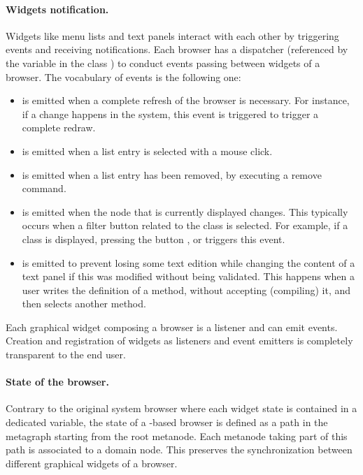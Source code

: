 \documentclass[a4paper,10pt,twoside]{book}
\begin{document}
\paragraph{Widgets notification.} Widgets like menu lists and text panels interact with each other by triggering events and receiving notifications. Each browser has a dispatcher (referenced by the variable  in the class ) to conduct events passing between widgets of a browser. The vocabulary of events is the following one:
\begin{itemize}
\item {} is emitted when a complete refresh of the browser is necessary. For instance, if a change happens in the system, this event is triggered to trigger a complete redraw.

\item {} is emitted when a list entry is selected with a mouse click. 

\item {} is emitted when a list entry has been removed, \eg by executing a remove command. 

\item {} is emitted when the node that is currently displayed changes. This typically occurs when a filter button related to the class is selected. For example, if a class is displayed, pressing the button ,  or  triggers this event.

\item {} is emitted to prevent losing some text edition while changing the content of a text panel if this was modified without being validated. This happens when a user writes the definition of a method, without accepting (\ie compiling) it, and then selects another method.
\end{itemize}

Each graphical widget composing a browser is a listener and can emit events. Creation and registration of widgets as listeners and event emitters is completely transparent to the end user.

\paragraph{State of the browser.} Contrary to the original \pharo system browser where each widget state is contained in a dedicated variable, the state of a \obf-based browser is defined as a path in the metagraph starting from the root metanode. Each metanode taking part of this path is associated to a domain node. This preserves the synchronization between different graphical widgets of a browser.
\end{document}
